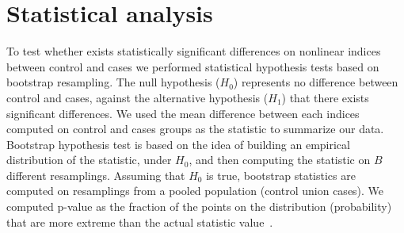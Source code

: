 \section{Statistical analysis}\label{sec:bootstrap}
To test whether exists statistically significant differences on nonlinear indices between control and cases we performed statistical hypothesis tests based on bootstrap resampling. The null hypothesis ($H_0$) represents no difference between control and cases, against the alternative hypothesis ($H_1$) that there exists significant differences. We used the mean difference between each indices computed on control and cases groups as the statistic to summarize our data. Bootstrap hypothesis test is based on the idea of building an empirical distribution of the statistic, under $H_0$, and then computing the statistic on $B$ different resamplings. Assuming that $H_0$ is true, bootstrap statistics are computed on resamplings from a pooled population (control union cases). We computed p-value as the fraction of the points on the distribution (probability) that are more extreme than the actual statistic value~\cite{efron1994,kaplan1999}.